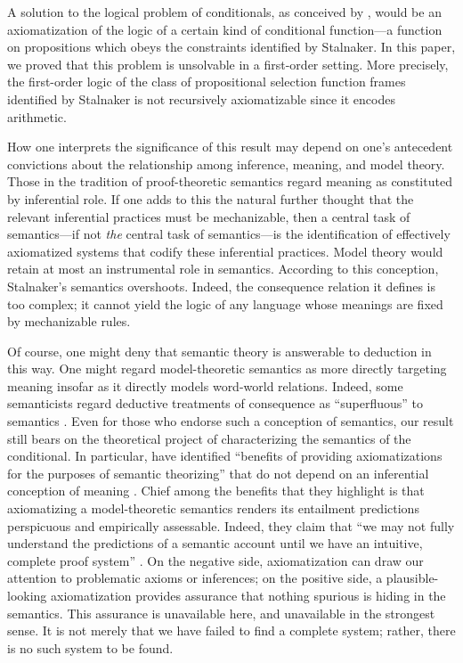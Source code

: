 \documentclass[12pt]{article}
\begin{document}
A solution to the logical problem of conditionals, as conceived by \cite{Stalnaker1968theory}, would be an axiomatization of the logic of a certain kind of conditional function---a function on propositions which obeys the constraints identified by Stalnaker. In this paper, we proved that this problem is unsolvable in a first-order setting. More precisely, the first-order logic of the class of propositional selection function frames identified by Stalnaker is not recursively axiomatizable since it encodes arithmetic.

How one interprets the significance of this result may depend on one's antecedent convictions about the relationship among inference, meaning, and model theory. Those in the tradition of proof-theoretic semantics regard meaning as constituted by inferential role. If one adds to this the natural further thought that the relevant inferential practices must be mechanizable, then a central task of semantics—if not \emph{the} central task of semantics—is the identification of effectively axiomatized systems that codify these inferential practices. Model theory would retain at most an instrumental role in semantics. According to this conception, Stalnaker's semantics overshoots. Indeed, the consequence relation it defines is too complex; it cannot yield the logic of any language whose meanings are fixed by mechanizable rules.

Of course, one might deny that semantic theory is answerable to deduction in this way. One might regard model-theoretic semantics as more directly targeting meaning insofar as it directly models word-world relations. Indeed, some semanticists regard deductive treatments of consequence as ``superfluous'' to semantics \parencite[53]{dowty2012introduction}. Even for those who endorse such a conception of semantics, our result still bears on the theoretical project of characterizing the semantics of the conditional.  In particular, \cite{Holliday2018} have identified “benefits of providing axiomatizations for the purposes of semantic theorizing” that do not depend on an inferential conception of meaning \parencite[73]{Holliday2018}. Chief among the benefits that they highlight is that axiomatizing a model-theoretic semantics renders its entailment predictions perspicuous and empirically assessable. Indeed, they claim that ``we may not fully
understand the predictions of a semantic account until we have an intuitive, complete proof system'' \parencite[77]{Holliday2018}. On the negative side, axiomatization can draw our attention to problematic axioms or inferences; on the positive side, a plausible-looking axiomatization provides assurance that nothing spurious is hiding in the semantics. This assurance is unavailable here, and unavailable in the strongest sense. It is not merely that we have failed to find a complete system; rather, there is no such system to be found.
\end{document}
